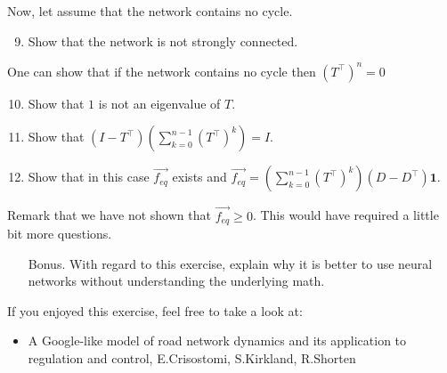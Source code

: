 Now, let assume that the network contains no cycle.
\begin{enumerate}
\setcounter{enumi}{8}
\item Show that the network is not strongly connected.

\sol{}
\end{enumerate}

One can show that if the network contains no cycle then $(T^{\top})^n = 0$
\begin{enumerate}
\setcounter{enumi}{9}
\item Show that $1$ is not an eigenvalue of $T$.

\sol{}
\item Show that $(I-T^\top) (\sum\limits_{k=0}^{n-1} (T^\top)^k) = I$.

\sol{}
\item Show that in this case $\vec{f_{eq}}$ exists and $\vec{f_{eq}} = (\sum\limits_{k=0}^{n-1} (T^\top)^k)(D - D^\top) \mathbf{1}$.

\sol{}
\end{enumerate}
Remark that we have not shown that $\vec{f_{eq}}\geq 0$. This would have required a little bit more questions.

\begin{enumerate}
\setcounter{enumi}{13}
\item[Bonus.] With regard to this exercise, explain why it is better to use neural networks without understanding the underlying math.

\sol{}
\end{enumerate}

If you enjoyed this exercise, feel free to take a look at:
\begin{itemize}
    \item A Google-like model of road network dynamics and its application to regulation and control, E.Crisostomi, S.Kirkland, R.Shorten
\end{itemize}